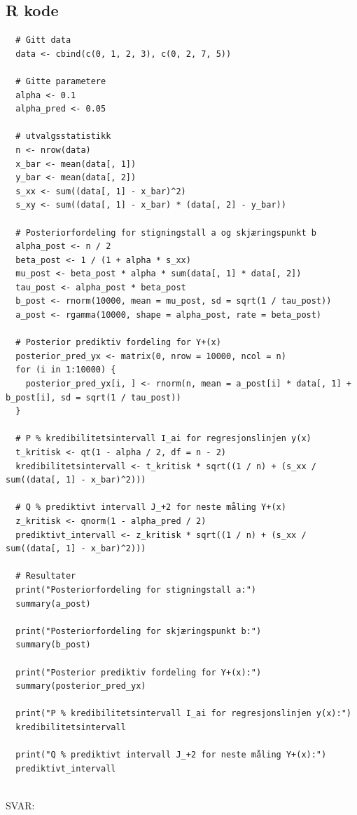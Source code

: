 \documentclass[12pt]{article}
\begin{document}
\subsection{R kode}
\begin{verbatim}
  # Gitt data
  data <- cbind(c(0, 1, 2, 3), c(0, 2, 7, 5))
  
  # Gitte parametere
  alpha <- 0.1
  alpha_pred <- 0.05
  
  # utvalgsstatistikk
  n <- nrow(data)
  x_bar <- mean(data[, 1])
  y_bar <- mean(data[, 2])
  s_xx <- sum((data[, 1] - x_bar)^2)
  s_xy <- sum((data[, 1] - x_bar) * (data[, 2] - y_bar))
  
  # Posteriorfordeling for stigningstall a og skjæringspunkt b
  alpha_post <- n / 2
  beta_post <- 1 / (1 + alpha * s_xx)
  mu_post <- beta_post * alpha * sum(data[, 1] * data[, 2])
  tau_post <- alpha_post * beta_post
  b_post <- rnorm(10000, mean = mu_post, sd = sqrt(1 / tau_post))
  a_post <- rgamma(10000, shape = alpha_post, rate = beta_post)
  
  # Posterior prediktiv fordeling for Y+(x)
  posterior_pred_yx <- matrix(0, nrow = 10000, ncol = n)
  for (i in 1:10000) {
    posterior_pred_yx[i, ] <- rnorm(n, mean = a_post[i] * data[, 1] + b_post[i], sd = sqrt(1 / tau_post))
  }
  
  # P % kredibilitetsintervall I_ai for regresjonslinjen y(x)
  t_kritisk <- qt(1 - alpha / 2, df = n - 2)
  kredibilitetsintervall <- t_kritisk * sqrt((1 / n) + (s_xx / sum((data[, 1] - x_bar)^2)))
  
  # Q % prediktivt intervall J_+2 for neste måling Y+(x)
  z_kritisk <- qnorm(1 - alpha_pred / 2)
  prediktivt_intervall <- z_kritisk * sqrt((1 / n) + (s_xx / sum((data[, 1] - x_bar)^2)))
  
  # Resultater
  print("Posteriorfordeling for stigningstall a:")
  summary(a_post)
  
  print("Posteriorfordeling for skjæringspunkt b:")
  summary(b_post)
  
  print("Posterior prediktiv fordeling for Y+(x):")
  summary(posterior_pred_yx)
  
  print("P % kredibilitetsintervall I_ai for regresjonslinjen y(x):")
  kredibilitetsintervall
  
  print("Q % prediktivt intervall J_+2 for neste måling Y+(x):")
  prediktivt_intervall
  
    \end{verbatim}
SVAR:
\end{document}
